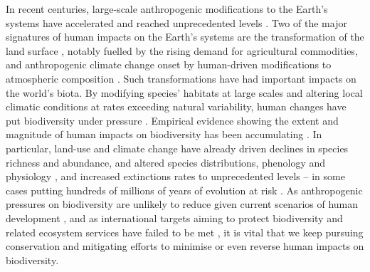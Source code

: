 

In recent centuries, large-scale anthropogenic modifications to the Earth's systems have accelerated and reached unprecedented levels \citep{Steffen2015}. Two of the major signatures of human impacts on the Earth's systems are the transformation of the land surface \citep{Ellis2010}, notably fuelled by the rising demand for agricultural commodities, and anthropogenic climate change onset by human-driven modifications to atmospheric composition \citep{Lewis2015}. Such transformations have had important impacts on the world's biota. By modifying species' habitats at large scales and altering local climatic conditions at rates exceeding natural variability, human changes have put biodiversity under pressure \citep{Maxwell2016}. Empirical evidence showing the extent and magnitude of human impacts on biodiversity has been accumulating \citep{Newbold2015, Young2016, Daru2021}. In particular, land-use and climate change have already driven declines in species richness and abundance, and altered species distributions, phenology and physiology \citep{Portner2008, Chown2010, Chen2011, Dirzo2014, Lenoir2015, Newbold2015, Soroye2020, Inouye2022, Butchart2010}, and increased extinctions rates to unprecedented levels \citep{Barnosky2011, Ceballos2015, DeVos2015} -- in some cases putting hundreds of millions of years of evolution at risk \citep{Nowakowski2018a, IUCN2020}. As anthropogenic pressures on biodiversity are unlikely to reduce given current scenarios of human development \citep{Stehfest2019}, and as international targets aiming to protect biodiversity and related ecosystem services have failed to be met \citep{Buchanan2020}, it is vital that we keep pursuing conservation and mitigating efforts to minimise or even reverse human impacts on biodiversity.

